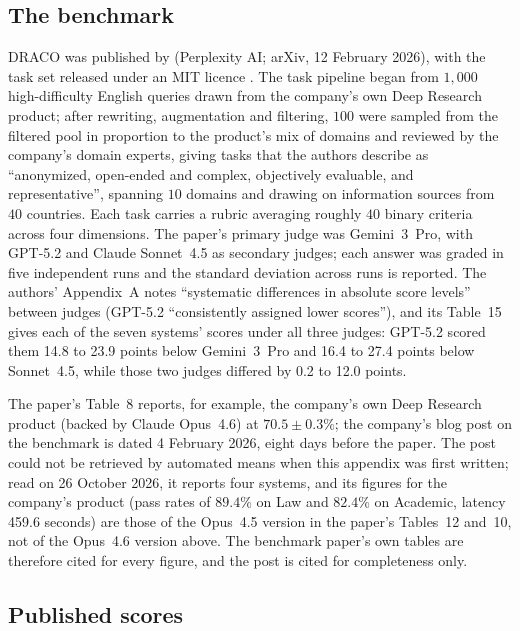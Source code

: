 \documentclass[11pt]{article}
\begin{document}
\subsection{The benchmark}

DRACO was published by \citet{draco2026} (Perplexity AI; arXiv, 12 February 2026), with
the task set released under an MIT licence \citep{draco2026dataset}. The task pipeline
began from $1{,}000$ high-difficulty English queries drawn from the company's own
Deep Research product; after rewriting, augmentation and filtering, $100$ were sampled from the filtered pool in proportion to the product's mix of domains and reviewed by the company's domain experts, giving tasks that the authors describe as
``anonymized, open-ended and complex, objectively evaluable, and representative'',
spanning $10$ domains and drawing on information sources from $40$ countries. Each task carries a rubric averaging
roughly $40$ binary criteria across four dimensions. The paper's primary judge was
Gemini~3~Pro, with GPT-5.2 and Claude Sonnet~4.5 as secondary judges; each answer was
graded in five independent runs and the standard deviation across runs is reported. The
authors' Appendix~A notes ``systematic differences in absolute score levels'' between
judges (GPT-5.2 ``consistently assigned lower scores''), and its Table~15 gives each of the seven systems' scores under all three judges: GPT-5.2 scored them 14.8 to 23.9 points below Gemini~3~Pro and 16.4 to 27.4 points below Sonnet~4.5, while those two judges differed by 0.2 to 12.0 points.

The paper's Table~8 reports, for example, the company's own Deep Research product
(backed by Claude Opus~4.6) at $70.5 \pm 0.3\%$; the company's blog post on the benchmark
\citep{perplexity2026explainer} is dated 4 February 2026, eight days before the paper. The post could not be retrieved by automated means when this appendix was first written; read on 26 October 2026, it reports four systems, and its figures for the company's product (pass rates of $89.4\%$ on Law and $82.4\%$ on Academic, latency 459.6 seconds) are those of the Opus~4.5 version in the paper's Tables~12 and~10, not of the Opus~4.6 version above. The benchmark paper's own tables are therefore cited for every figure, and the post is cited for completeness only.

\subsection{Published scores}
\end{document}
